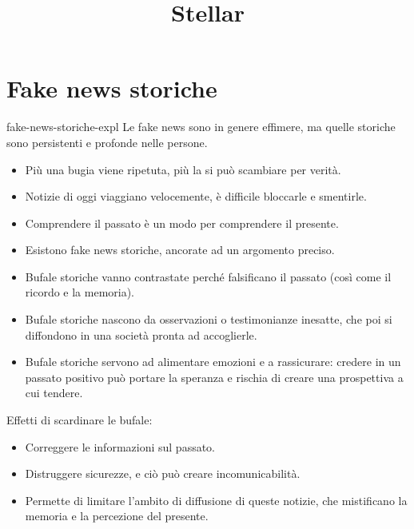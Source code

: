 \documentclass[preview]{standalone}
\begin{document}
\title{Stellar}
\genpage

\section{Fake news storiche}


\begin{snippet}{fake-news-storiche-expl}
    Le fake news sono in genere effimere, ma quelle storiche sono persistenti e
    profonde nelle persone.

    \begin{itemize}
        \item Più una bugia viene ripetuta, più la si può scambiare per verità.
        \item Notizie di oggi viaggiano velocemente, è difficile bloccarle e smentirle.
        \item Comprendere il passato è un modo per comprendere il presente.
        \item Esistono fake news storiche, ancorate ad un argomento preciso.
        \item Bufale storiche vanno contrastate perché falsificano il passato (così come il ricordo e la memoria).
        \item Bufale storiche nascono da osservazioni o testimonianze inesatte, che poi si diffondono in una società pronta ad accoglierle.
        \item Bufale storiche servono ad alimentare emozioni e a rassicurare: credere in un passato positivo può portare la speranza e rischia di creare una prospettiva a cui tendere.
    \end{itemize}

    Effetti di scardinare le bufale:

    \begin{itemize}
        \item Correggere le informazioni sul passato.
        \item Distruggere sicurezze, e ciò può creare incomunicabilità.
        \item Permette di limitare l'ambito di diffusione di queste notizie, che mistificano la memoria e la percezione del presente.
    \end{itemize}
\end{snippet}
\end{document}
